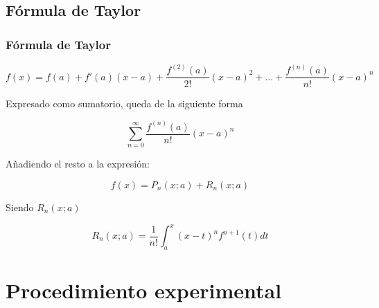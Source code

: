 \documentclass{beamer}
\begin{document}
\subsection{Fórmula de Taylor}
\begin{frame}
 \frametitle{Fórmula de Taylor}

\begin{displaymath}
f(x) = f(a)+f'(a)(x-a) + \frac{f^{(2)}(a)}{2!}(x-a)^2 + \ldots{} + \frac{f^{(n)}(a)}{n!}(x-a)^n
\end{displaymath}

Expresado como sumatorio, queda de la siguiente forma

\begin{displaymath}
\sum_{n=0}^\infty\frac{f^{(n)}(a)}{n!}(x-a)^{n}
\end{displaymath}

Añadiendo el resto a la expresión:

\begin{displaymath}
f(x) = P_n(x;a) + R_n(x;a)
\end{displaymath}

Siendo $R_n(x;a)$

\begin{displaymath}
R_n(x;a) = \frac{1}{n!}\int_{a}^{x} (x-t)^nf^{n+1}(t)dt
\end{displaymath}

\end{frame}


\section{Procedimiento experimental}
\end{document}
